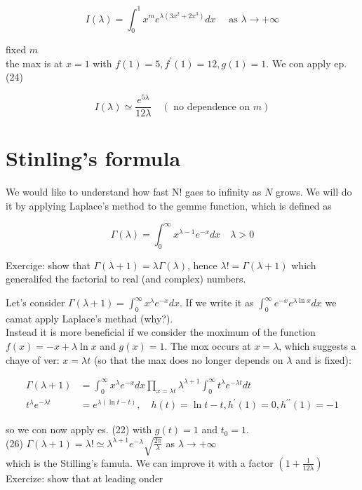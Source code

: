 \documentclass[10pt]{article}
\begin{document}
$$
I(\lambda)=\int_{0}^{1} x^{m} e^{\lambda\left(3 x^{2}+2 x^{3}\right)} d x \quad \text { as } \lambda \rightarrow+\infty
$$

fixed $m$\\
the max is at $x=1$ with $f(1)=5, f^{\prime}(1)=12, g(1)=1$. We con apply ep. (24)

$$
I(\lambda) \simeq \frac{e^{5 \lambda}}{12 \lambda} \quad(\text { no dependence on } m)
$$

\section*{Stinling's formula}
We would like to understand how fast N! gaes to infinity as $N$ grows. We will do it by applying Laplace's method to the gemme function, which is defined as


\begin{equation*}
\Gamma(\lambda)=\int_{0}^{\infty} x^{\lambda-1} e^{-x} d x \quad \lambda>0 \tag{25}
\end{equation*}


Exercige: show that $\Gamma(\lambda+1)=\lambda \Gamma(\lambda)$, hence $\lambda!=\Gamma(\lambda+1)$ which generalifed the factorial to real (and complex) numbers.

Let's consider $\Gamma(\lambda+1)=\int_{0}^{\infty} x^{\lambda} e^{-x} d x$. If we write it as $\int_{0}^{\infty} e^{-x} e^{\lambda \ln x} d x$ we camat apply Laplace's methad (why?).\\
Instead it is more beneficial if we consider the moximum of the function $f(x)=-x+\lambda \ln x$ and $g(x)=1$. The mox occurs at $x=\lambda$, which suggests a chaye of ver: $x=\lambda t$ (so that the max does no longer depends on $\lambda$ and is fixed):

$$
\begin{aligned}
\Gamma(\lambda+1) & =\int_{0}^{\infty} x^{\lambda} e^{-x} d x \prod_{x=\lambda t} \lambda^{\lambda+1} \int_{0}^{\infty} t^{\lambda} e^{-\lambda t} d t \\
t^{\lambda} e^{-\lambda t} & =e^{\lambda(\ln t-t)}, \quad h(t)=\ln t-t, h^{\prime}(1)=0, h^{\prime \prime}(1)=-1
\end{aligned}
$$

so we con now apply es. (22) with $g(t)=1$ and $t_{0}=1$.\\
(26) $\Gamma(\lambda+1)=\lambda!\simeq \lambda^{\lambda+1} e^{-\lambda} \sqrt{\frac{2 \pi}{\lambda}}$ as $\lambda \rightarrow+\infty$\\
which is the Stilling's famula. We can improve it with a factor $\left(1+\frac{1}{12 \lambda}\right)$\\
Exercize: show that at leading onder
\end{document}

